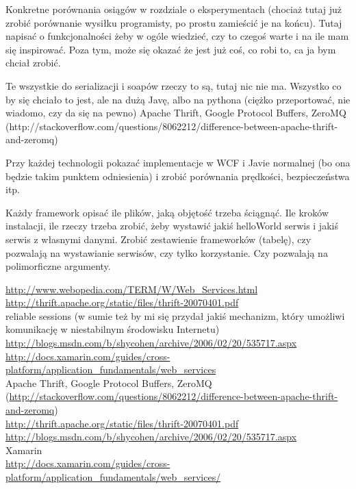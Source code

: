 \documentclass[twoside,a4paper]{book}
\begin{document}
Konkretne porównania osiągów w rozdziale o eksperymentach (chociaż tutaj już zrobić porównanie wysiłku programisty, po prostu zamieścić je na końcu). Tutaj napisać o funkcjonalności żeby w ogóle wiedzieć, czy to czegoś warte i na ile mam się inspirować. Poza tym, może się okazać że jest już coś, co robi to, ca ja bym chciał zrobić.

Te wszystkie do serializacji i soapów rzeczy to są, tutaj nic nie ma. Wszystko co by się chciało to jest, ale na dużą Javę, albo na pythona (ciężko przeportować, nie wiadomo, czy da się na pewno) Apache Thrift, Google Protocol Buffers, ZeroMQ (http://stackoverflow.com/questions/8062212/difference-between-apache-thrift-and-zeromq)

Przy każdej technologii pokazać implementacje w WCF i Javie normalnej (bo ona będzie takim punktem odniesienia) i zrobić porównania prędkości, bezpieczeństwa itp.

Każdy framework opisać ile plików, jaką objętość trzeba ściągnąć. Ile kroków instalacji, ile rzeczy trzeba zrobić, żeby wystawić jakiś helloWorld serwis i jakiś serwis z własnymi danymi. Zrobić zestawienie frameworków (tabelę), czy pozwalają na wystawianie serwisów, czy tylko korzystanie. Czy pozwalają na polimorficzne argumenty.

\url{http://www.webopedia.com/TERM/W/Web_Services.html}\\
\url{http://thrift.apache.org/static/files/thrift-20070401.pdf}\\
reliable sessions (w sumie też by mi się przydał jakiś mechanizm, który umożliwi komunikację w niestabilnym środowisku Internetu)\\
\url{http://blogs.msdn.com/b/shycohen/archive/2006/02/20/535717.aspx}\\
\url{http://docs.xamarin.com/guides/cross-platform/application_fundamentals/web_services}\\

Apache Thrift, Google Protocol Buffers, ZeroMQ (\url{http://stackoverflow.com/questions/8062212/difference-between-apache-thrift-and-zeromq})\\
\url{http://thrift.apache.org/static/files/thrift-20070401.pdf}\\
\url{http://blogs.msdn.com/b/shycohen/archive/2006/02/20/535717.aspx}\\
Xamarin\\
\url{http://docs.xamarin.com/guides/cross-platform/application_fundamentals/web_services/}\\
\end{document}
